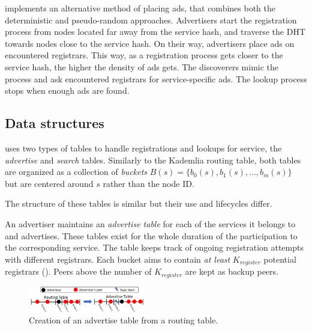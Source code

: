 \sysname implements an alternative method of placing ads, that combines both the deterministic and pseudo-random approaches.
Advertisers start the registration process from nodes located far away from the service hash, and traverse the DHT towards nodes close to the service hash.
On their way, advertisers place ads on encountered registrars.
This way, as a registration process gets closer to the service hash, the higher the density of ads gets.
The discoverers mimic the process and ask encountered registrars for service-specific ads.
The lookup process stops when enough ads are found.

\subsection{Data structures}
\label{sec:struct}

\sysname uses two types of tables to handle registrations and lookups for service, the \emph{advertise} and \emph{search} tables.
Similarly to the Kademlia routing table, both tables are organized as a collection of \emph{buckets} $B(s) = \{b_0(s), b_1(s),..., b_m(s)\}$ but are centered around $s$ rather than the node ID.

The structure of these tables is similar but their use and lifecycles differ. 



An advertiser maintains an \emph{advertise table} for each of the services it belongs to and advertises.
These tables exist for the whole duration of the participation to the corresponding service.
The table keeps track of ongoing registration attempts with different registrars.
Each bucket aims to contain \emph{at least} $K_\textit{register}$ potential registrars ().
Peers above the number of $K_\textit{register}$ are kept as backup peers.

\begin{figure}
    \includegraphics[width=0.45\textwidth]{img/tables}
    \vspace{-0.05in}
    \caption{Creation of an advertise table from a routing table.} %
    \label{fig:advertise_table}
    \vspace{-0.15in}
\end{figure}

